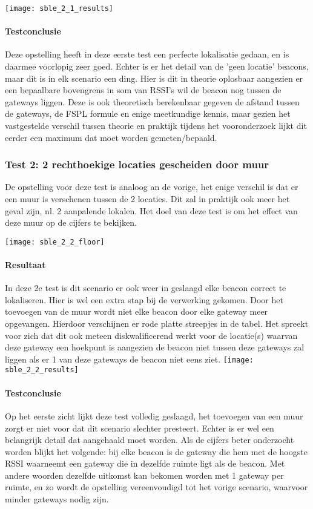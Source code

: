 \texttt{[image: sble\_2\_1\_results]}

\paragraph{Testconclusie}
Deze opstelling heeft in deze eerste test een perfecte lokalisatie gedaan, en is daarmee voorlopig zeer goed. Echter is er het detail van de 'geen locatie' beacons, maar dit is in elk scenario een ding. Hier is dit in theorie oplosbaar aangezien er een bepaalbare bovengrens in som van RSSI's wil de beacon nog tussen de gateways liggen. Deze is ook theoretisch berekenbaar gegeven de afstand tussen de gateways, de FSPL formule en enige meetkundige kennis, maar gezien het vastgestelde verschil tussen theorie en praktijk tijdens het vooronderzoek lijkt dit eerder een maximum dat moet worden gemeten/bepaald.

\subsubsection{Test 2: 2 rechthoekige locaties gescheiden door muur}
\begin{minipage}{0.55\textwidth}
De opstelling voor deze test is analoog an de vorige, het enige verschil is dat er een muur is verschenen tussen de 2 locaties. Dit zal in praktijk ook meer het geval zijn, nl. 2 aanpalende lokalen. Het doel van deze test is om het effect van deze muur op de cijfers te bekijken.
\end{minipage}
\hfill
\begin{minipage}{0.42\textwidth}
	\texttt{[image: sble\_2\_2\_floor]}
\end{minipage}

\paragraph{Resultaat}
In deze 2e test is dit scenario er ook weer in geslaagd elke beacon correct te lokaliseren. Hier is wel een extra stap bij de verwerking gekomen. Door het toevoegen van de muur wordt niet elke beacon door elke gateway meer opgevangen. Hierdoor verschijnen er rode platte streepjes in de tabel. Het spreekt voor zich dat dit ook meteen diskwalificerend werkt voor de locatie(s) waarvan deze gateway een hoekpunt is aangezien de beacon niet tussen deze gateways zal liggen als er 1 van deze gateways de beacon niet eens ziet.
\texttt{[image: sble\_2\_2\_results]}

\paragraph{Testconclusie}
Op het eerste zicht lijkt deze test volledig geslaagd, het toevoegen van een muur zorgt er niet voor dat dit scenario slechter presteert. Echter is er wel een belangrijk detail dat aangehaald moet worden. Als de cijfers beter onderzocht worden blijkt het volgende: bij elke beacon is de gateway die hem met de hoogste RSSI waarneemt een gateway die in dezelfde ruimte ligt als de beacon. Met andere woorden dezelfde uitkomst kan bekomen worden met 1 gateway per ruimte, en zo wordt de opstelling vereenvoudigd tot het vorige scenario, waarvoor minder gateways nodig zijn.


